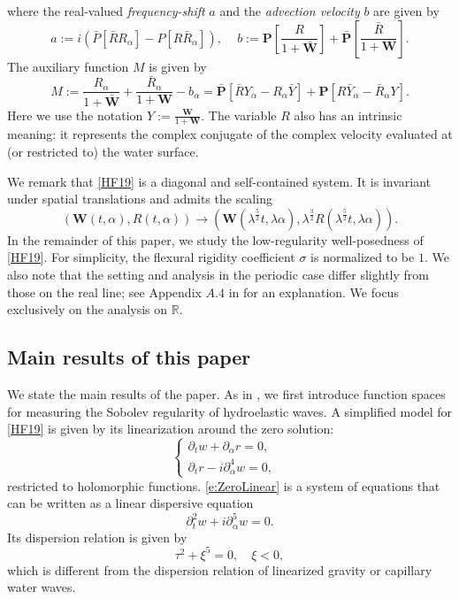 \documentclass[10pt]{amsart}
\theoremstyle{remark}
\theoremstyle{definition}
\numberwithin{equation}{section}
\newcommand{\p}{\partial}
\newcommand{\R}{\mathbb{R}}
\newcommand{\al}{\alpha}
\newcommand{\f}{\frac}
\newcommand{\bw}{\mathbf{W}}
\newcommand{\nP}{{\mathbf P}}
\begin{document}
where the real-valued \textit{frequency-shift} $a$ and the \textit{advection velocity} $b$ are given by
\begin{equation}\label{HF17}
		a:=i\left(\bar{P}[\bar{R}R_{\al}]-P[R\bar{R}_{\al}]\right),\, \quad b:= \nP\left[ \frac{R}{1+\bar{\bw}}\right] + \bar{\nP}\left[ \frac{\bar{R}}{1+\bw}\right].
\end{equation}
The auxiliary function $M$ is given by
\begin{equation} \label{MDef}
		M:=\f{R_{\al}}{1+\bar{\mathbf{W}}}+\f{\bar{R}_{\al}}{1+\mathbf{W}}-b_{\al}=\bar{\nP}[\bar{R}Y_{\al}-R_{\al}\bar{Y}]+\nP[R\bar{Y}_{\al}-\bar{R}_{\al}Y].
	\end{equation}
Here we use the notation $Y:=\f{\bw}{1+\bw}$.
 The variable $R$ also has an intrinsic meaning:  it represents the complex conjugate of the complex velocity evaluated at (or restricted to) the water surface.
    
We remark that \eqref{HF19} is a diagonal and self-contained system.
It is invariant under spatial translations and admits the scaling
\begin{equation} \label{Scaling}
 \left(\bw(t,\alpha), R(t,\alpha)\right) \to \left( \bw(\lambda^\f52 t,\lambda \alpha), 
\lambda^{\frac32} R(\lambda^\f52 t,\lambda \alpha)\right).
\end{equation}
In the remainder of this paper, we study the low-regularity well-posedness of \eqref{HF19}.
For simplicity, the flexural rigidity coefficient $\sigma$ is normalized to be $1$.
 We also note that the setting and analysis in the periodic case differ slightly from those on the real line; see Appendix $A.4$ in \cite{MR3535894} for an explanation. 
We focus exclusively on the analysis on $\R$.
	
\subsection{Main results of this paper}
We state the main results of the paper. 
As in \cite{MR3667289}, we first introduce function spaces for measuring the Sobolev regularity of hydroelastic waves. 
A simplified model for \eqref{HF19} is given by its linearization around the zero solution:
\begin{equation}
\left\{
             \begin{array}{lr}
             \partial_t w + \p_\alpha r = 0, &  \\
             \p_t r  -i\p^4_\alpha w =0,&
             \end{array}
\right.\label{e:ZeroLinear}
\end{equation}
restricted to holomorphic functions.
\eqref{e:ZeroLinear} is a system of equations that can be written as a linear dispersive equation
\begin{equation*}
    \p_t^2w+  i \p^5_\al w =0.
\end{equation*}
Its dispersion relation is given by
\begin{equation*}
    \tau^2 + \xi^5 =0, \quad \xi< 0,
\end{equation*}
which is different from the dispersion relation of linearized gravity or capillary water waves.
\end{document}
